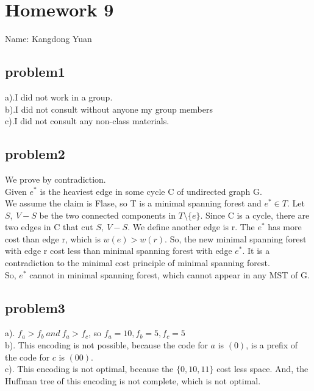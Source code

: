 \documentclass[11pt]{article}
\begin{document}
\section{Homework 9}
Name: Kangdong Yuan
	
\subsection{problem1}
a).I did not work in a group.
\\b).I did not consult without anyone my group members
\\c).I did not consult any non-class materials.

\subsection{problem2}
We prove by contradiction.\\
Given $e^*$ is the heaviest edge in some cycle C of undirected graph G.\\
We assume the claim is Flase, so T is a minimal spanning forest and $e^* \in T$. Let $S, \ V-S$ be the two connected components in $T \setminus \{e\}$. Since C is a cycle, there are two edges in C that cut $S, \ V-S$. We define another edge is r. The $e^*$ has more cost than edge r, which is $w(e)>w(r)$. So, the new minimal spanning forest with edge r cost less than minimal spanning forest with edge $e^*$. It is a contradiction to the minimal cost principle of minimal spanning forest.\\
So, $e^*$ cannot in minimal spanning forest, which cannot appear in any MST of G.


\subsection{problem3}
a). $f_a>f_b \ and \ f_a>f_c$, so $f_a=10, f_b=5, f_c=5$\\
b). This encoding is not possible, because the code for $a$ is $(0)$, is a prefix of the code for $c$ is $(00)$. \\
c). This encoding is not optimal, because the $\{0,10,11\}$ cost less space. And, the Huffman tree of this encoding is not complete, which is not optimal. 
\end{document}
